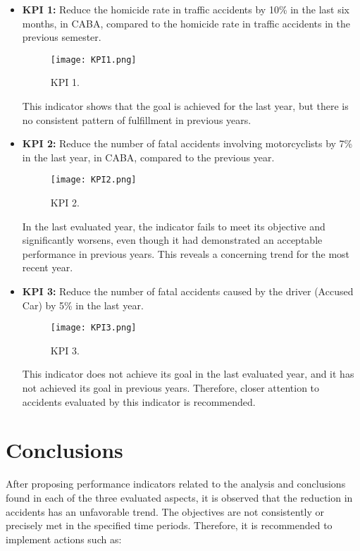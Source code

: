\documentclass[12pt]{article}
\begin{document}
\begin{itemize}
    \item \textbf{KPI 1:} Reduce the homicide rate in traffic accidents by 10\% in the last six months, in CABA, compared to the homicide rate in traffic accidents in the previous semester.

\begin{figure}[H]
  \centering
  \texttt{[image: KPI1.png]}
  \caption{KPI 1.}
  \label{fig:KPI 1}
\end{figure}

    This indicator shows that the goal is achieved for the last year, but there is no consistent pattern of fulfillment in previous years.

    \item \textbf{KPI 2:} Reduce the number of fatal accidents involving motorcyclists by 7\% in the last year, in CABA, compared to the previous year.

\begin{figure}[H]
  \centering
  \texttt{[image: KPI2.png]}
  \caption{KPI 2.}
  \label{fig:KPI 2}
\end{figure}

    In the last evaluated year, the indicator fails to meet its objective and significantly worsens, even though it had demonstrated an acceptable performance in previous years. This reveals a concerning trend for the most recent year.

    \item \textbf{KPI 3:} Reduce the number of fatal accidents caused by the driver (Accused Car) by 5\% in the last year.

\begin{figure}[H]
  \centering
  \texttt{[image: KPI3.png]}
  \caption{KPI 3.}
  \label{fig:KPI 3}
\end{figure}

    This indicator does not achieve its goal in the last evaluated year, and it has not achieved its goal in previous years. Therefore, closer attention to accidents evaluated by this indicator is recommended.
\end{itemize}

\section{Conclusions}
After proposing performance indicators related to the analysis and conclusions found in each of the three evaluated aspects, it is observed that the reduction in accidents has an unfavorable trend. The objectives are not consistently or precisely met in the specified time periods. Therefore, it is recommended to implement actions such as:
\end{document}
